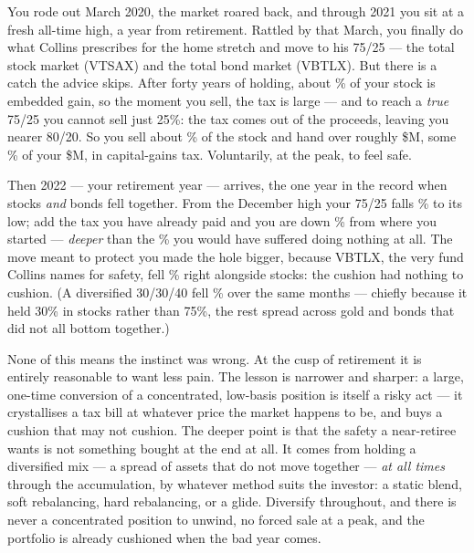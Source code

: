 \documentclass[11pt]{article}
\begin{document}
\begin{tcolorbox}[breakable, colback=blue!4!white, colframe=blue!50!black,
  title=\textbf{Eighteen months later: you held on, and you were right}]
You rode out March 2020, the market roared back, and through 2021 you sit at a fresh all-time high, a
year from retirement. Rattled by that March, you finally do what Collins prescribes for the home stretch
and move to his 75/25 --- the total stock market (VTSAX) and the total bond market (VBTLX). But there is
a catch the advice skips. After forty years of holding, about \GainFrac\% of your stock is embedded gain,
so the moment you sell, the tax is large --- and to reach a \emph{true} 75/25 you cannot sell just 25\%:
the tax comes out of the proceeds, leaving you nearer 80/20. So you sell about \FlipSalePct\% of the
stock and hand over roughly \$\FlipTax M, some \FlipTaxPct\% of your \$\StockOnlyWealth M, in
capital-gains tax. Voluntarily, at the peak, to feel safe.

Then 2022 --- your retirement year --- arrives, the one year in the record when stocks \emph{and} bonds
fell together. From the December high your 75/25 falls \SevenFiveDD\% to its low; add the tax you have
already paid and you are down \FlipTotalDD\% from where you started --- \emph{deeper} than the
\StockDD\% you would have suffered doing nothing at all. The move meant to protect you made the hole
bigger, because VBTLX, the very fund Collins names for safety, fell \BondDD\% right alongside stocks: the
cushion had nothing to cushion. (A diversified 30/30/40 fell \DivDD\% over the same months --- chiefly
because it held 30\% in stocks rather than 75\%, the rest spread across gold and bonds that did not all
bottom together.)

None of this means the instinct was wrong. At the cusp of retirement it is entirely reasonable to want
less pain. The lesson is narrower and sharper: a large, one-time conversion of a concentrated, low-basis
position is itself a risky act --- it crystallises a tax bill at whatever price the market happens to be,
and buys a cushion that may not cushion. The deeper point is that the safety a near-retiree wants is not
something bought at the end at all. It comes from holding a diversified mix --- a spread of assets that do
not move together --- \emph{at all times} through the accumulation, by whatever method suits the investor:
a static blend, soft rebalancing, hard rebalancing, or a glide. Diversify throughout, and there is never
a concentrated position to unwind, no forced sale at a peak, and the portfolio is already cushioned when the
bad year comes.
\end{tcolorbox}
\end{document}
